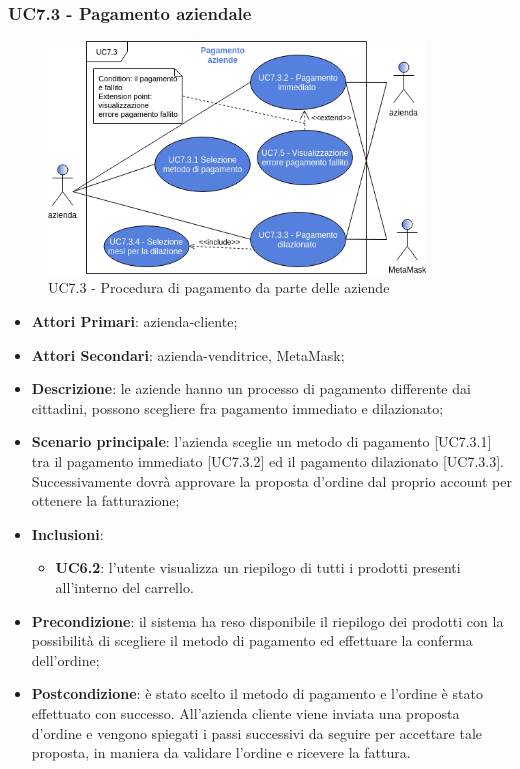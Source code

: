 \subsubsection{UC7.3 - Pagamento aziendale}
\begin{figure}[H]
	\includegraphics[width=10cm]{res/images/UC7-PagamentoAzienda.png}
	\centering
	\caption{UC7.3 - Procedura di pagamento da parte delle aziende}
\end{figure}
\begin{itemize}
	\item \textbf{Attori Primari}: azienda-cliente;
	\item \textbf{Attori Secondari}: azienda-venditrice, MetaMask\glo;
	\item \textbf{Descrizione}: le aziende hanno un processo di pagamento differente dai cittadini, possono scegliere fra pagamento immediato e dilazionato\glo;
	\item \textbf{Scenario principale}: l'azienda sceglie un metodo di pagamento [UC7.3.1] tra il pagamento immediato [UC7.3.2] ed il pagamento dilazionato [UC7.3.3]. Successivamente dovrà approvare la proposta d'ordine dal proprio account per ottenere la fatturazione;
	\item \textbf{Inclusioni}: 
	\begin{itemize}
		\item \textbf{UC6.2}: l'utente visualizza un riepilogo di tutti i prodotti presenti all'interno del carrello.
	\end{itemize}
	\item \textbf{Precondizione}: il sistema ha reso disponibile il riepilogo dei prodotti con la possibilità di scegliere il metodo di pagamento ed effettuare la conferma dell'ordine;
	\item \textbf{Postcondizione}: è stato scelto il metodo di pagamento e l'ordine è stato effettuato con successo. All'azienda cliente viene inviata una proposta d'ordine e vengono spiegati i passi successivi da seguire per accettare tale proposta, in maniera da validare l'ordine e ricevere la fattura.
\end{itemize} 

